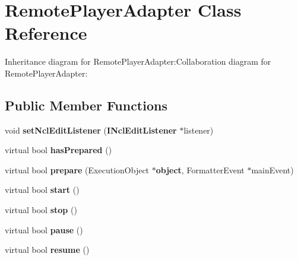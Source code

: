 \section{RemotePlayerAdapter Class Reference}
\label{classbr_1_1pucrio_1_1telemidia_1_1ginga_1_1ncl_1_1adapters_1_1remote_1_1RemotePlayerAdapter}
Inheritance diagram for RemotePlayerAdapter:Collaboration diagram for RemotePlayerAdapter:\subsection*{Public Member Functions}
\begin{CompactItemize}
\item 
void \textbf{setNclEditListener} ({\bf INclEditListener} $\ast$listener)\label{classbr_1_1pucrio_1_1telemidia_1_1ginga_1_1ncl_1_1adapters_1_1remote_1_1RemotePlayerAdapter_c93507f3caf7d9f57e8dc4f55f824fe5}

\item 
virtual bool \textbf{hasPrepared} ()\label{classbr_1_1pucrio_1_1telemidia_1_1ginga_1_1ncl_1_1adapters_1_1remote_1_1RemotePlayerAdapter_54fc8af2d22bee49a7858c6e0df829db}

\item 
virtual bool \textbf{prepare} (ExecutionObject $\ast${\bf object}, FormatterEvent $\ast$mainEvent)\label{classbr_1_1pucrio_1_1telemidia_1_1ginga_1_1ncl_1_1adapters_1_1remote_1_1RemotePlayerAdapter_96d0bce73b715f0a6fe5dedf903a5529}

\item 
virtual bool \textbf{start} ()\label{classbr_1_1pucrio_1_1telemidia_1_1ginga_1_1ncl_1_1adapters_1_1remote_1_1RemotePlayerAdapter_2a1dbe283ac44900c920f3f79339f9f6}

\item 
virtual bool \textbf{stop} ()\label{classbr_1_1pucrio_1_1telemidia_1_1ginga_1_1ncl_1_1adapters_1_1remote_1_1RemotePlayerAdapter_3d0f1501fa4ccfb9e3f868ab4a185856}

\item 
virtual bool \textbf{pause} ()\label{classbr_1_1pucrio_1_1telemidia_1_1ginga_1_1ncl_1_1adapters_1_1remote_1_1RemotePlayerAdapter_1bb2a8fd099734a2a6d1cab9fbca1939}

\item 
virtual bool \textbf{resume} ()\label{classbr_1_1pucrio_1_1telemidia_1_1ginga_1_1ncl_1_1adapters_1_1remote_1_1RemotePlayerAdapter_0c7b890cc1963471052f4d51db565f8a}


\end{CompactItemize}

